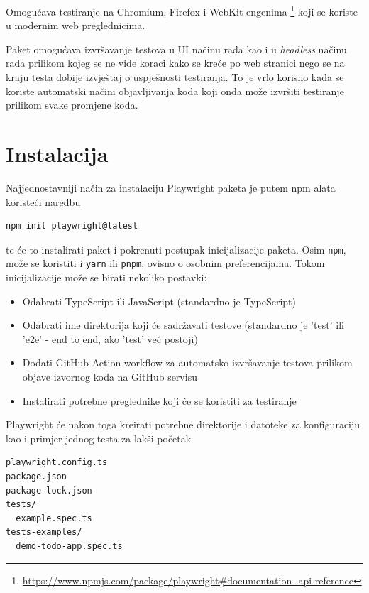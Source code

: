 Omogućava testiranje na Chromium, Firefox i WebKit engenima \footnote{\url{https://www.npmjs.com/package/playwright\#documentation--api-reference}} koji se koriste u modernim web preglednicima.

Paket omogućava izvršavanje testova u UI načinu rada kao i u \emph{headless} načinu rada prilikom kojeg se ne vide koraci kako se kreće po web stranici nego se na kraju testa dobije izvještaj o uspješnosti testiranja.
To je vrlo korisno kada se koriste automatski načini objavljivanja koda koji onda može izvršiti testiranje prilikom svake promjene koda.

\section{Instalacija}

Najjednostavniji način za instalaciju Playwright paketa je putem npm alata koristeći naredbu
\begin{verbatim}
npm init playwright@latest
\end{verbatim}
te će to instalirati paket i pokrenuti postupak inicijalizacije paketa.
Osim \texttt{npm}, može se koristiti i \texttt{yarn} ili \texttt{pnpm}, ovisno o osobnim preferencijama.
Tokom inicijalizacije može se birati nekoliko postavki:
\begin{itemize}
    \item Odabrati TypeScript ili JavaScript (standardno je TypeScript)
    \item Odabrati ime direktorija koji će sadržavati testove (standardno je 'test' ili 'e2e' - end to end, ako 'test' već postoji)
    \item Dodati GitHub Action workflow za automatsko izvršavanje testova prilikom objave izvornog koda na GitHub servisu
    \item Instalirati potrebne preglednike koji će se koristiti za testiranje
    
\end{itemize}

Playwright će nakon toga kreirati potrebne direktorije i datoteke za konfiguraciju kao i primjer jednog testa za lakši početak
\begin{verbatim}
playwright.config.ts
package.json
package-lock.json
tests/
  example.spec.ts
tests-examples/
  demo-todo-app.spec.ts
\end{verbatim}

